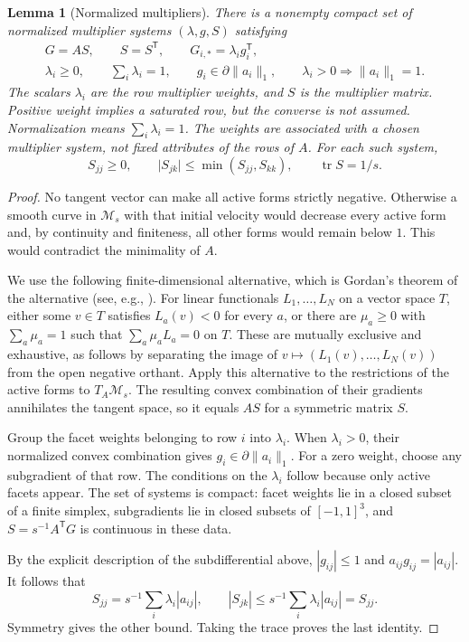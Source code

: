 \documentclass[11pt]{article}
\numberwithin{equation}{section}
\newtheorem{lemma}[lemma]{Lemma}
\theoremstyle{definition}
\theoremstyle{definition}
\newcommand{\abs}[1]{\lvert#1\rvert}
\newcommand{\norm}[1]{\lVert#1\rVert}
\DeclareMathOperator{\tr}{tr}
\begin{document}
\begin{lemma}[Normalized multipliers]\label{lem:multipliers}
There is a nonempty compact set of normalized multiplier systems
$(\lambda,g,S)$ satisfying
\begin{gather*}
 G=AS,\qquad S=S^{\mathsf T},\qquad
 G_{i,*}=\lambda_i g_i^{\mathsf T},\\
 \lambda_i\ge0,\qquad \sum_i\lambda_i=1,\qquad
 g_i\in\partial\norm{a_i}_1,
 \qquad \lambda_i>0\Longrightarrow\norm{a_i}_1=1.
\end{gather*}
The scalars $\lambda_i$ are the \emph{row multiplier weights},
and $S$ is the \emph{multiplier matrix}. Positive weight implies
a saturated row, but the converse is not assumed.
Normalization means $\sum_i\lambda_i=1$. The weights are
associated with a chosen multiplier system, not fixed attributes
of the rows of $A$. For each such system,
\begin{equation}\label{eq:multiplier-bounds}
 S_{jj}\ge0,\qquad
 \abs{S_{jk}}\le\min(S_{jj},S_{kk}),\qquad \tr S=1/s.
\end{equation}
\end{lemma}
\begin{proof}
No tangent vector can make all active forms strictly negative.
Otherwise a smooth curve in $\mathcal M_s$ with that initial velocity
would decrease every active form and, by continuity and finiteness, all
other forms would remain below $1$.  This would contradict the
minimality of $A$.

We use the following finite-dimensional alternative, which is
Gordan's theorem of the alternative (see, e.g.,
\cite[Ch.~7]{Schrijver1986}).  For linear
functionals $L_1,\ldots,L_N$ on a vector space $T$, either some
$v\in T$ satisfies $L_a(v)<0$ for every $a$, or there are
$\mu_a\ge0$ with $\sum_a\mu_a=1$ such that
$\sum_a\mu_aL_a=0$ on $T$.  These are mutually exclusive and
exhaustive, as follows by separating the image of
$v\mapsto(L_1(v),\ldots,L_N(v))$ from the open negative orthant.
Apply this alternative to the restrictions of the active forms to
$T_A\mathcal M_s$.  The resulting convex combination of their
gradients annihilates the tangent space, so it equals $AS$ for a
symmetric matrix $S$.

Group the facet weights belonging to row $i$ into $\lambda_i$.
When $\lambda_i>0$, their normalized convex combination gives
$g_i\in\partial\norm{a_i}_1$.  For a zero weight, choose any
subgradient of that row.  The conditions on the $\lambda_i$ follow
because only active facets appear.  The set of systems is compact:
facet weights lie in a closed subset of a finite simplex, subgradients
lie in closed subsets of $[-1,1]^3$, and
$S=s^{-1}A^{\mathsf T}G$ is continuous in these data.

By the explicit description of the subdifferential above,
$|g_{ij}|\le1$ and $a_{ij}g_{ij}=|a_{ij}|$. It follows that
\[
 S_{jj}=s^{-1}\sum_i\lambda_i|a_{ij}|,\qquad
 |S_{jk}|\le s^{-1}\sum_i\lambda_i|a_{ij}|=S_{jj}.
\]
Symmetry gives the other bound. Taking the trace proves the last identity.
\end{proof}
\end{document}
